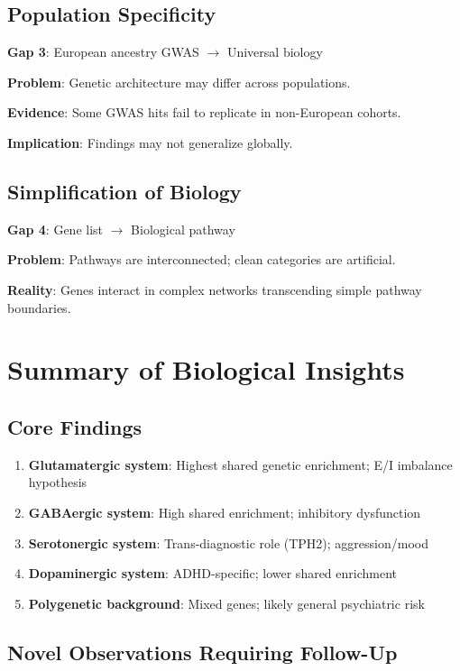 \documentclass[12pt,letterpaper]{article}
\begin{document}
\subsection{Population Specificity}

\textbf{Gap 3}: European ancestry GWAS $\rightarrow$ Universal biology

\textbf{Problem}: Genetic architecture may differ across populations.

\textbf{Evidence}: Some GWAS hits fail to replicate in non-European cohorts.

\textbf{Implication}: Findings may not generalize globally.

\subsection{Simplification of Biology}

\textbf{Gap 4}: Gene list $\rightarrow$ Biological pathway

\textbf{Problem}: Pathways are interconnected; clean categories are artificial.

\textbf{Reality}: Genes interact in complex networks transcending simple pathway boundaries.

\section{Summary of Biological Insights}

\subsection{Core Findings}

\begin{enumerate}
    \item \textbf{Glutamatergic system}: Highest shared genetic enrichment; E/I imbalance hypothesis
    \item \textbf{GABAergic system}: High shared enrichment; inhibitory dysfunction
    \item \textbf{Serotonergic system}: Trans-diagnostic role (TPH2); aggression/mood
    \item \textbf{Dopaminergic system}: ADHD-specific; lower shared enrichment
    \item \textbf{Polygenetic background}: Mixed genes; likely general psychiatric risk
\end{enumerate}

\subsection{Novel Observations Requiring Follow-Up}
\end{document}
